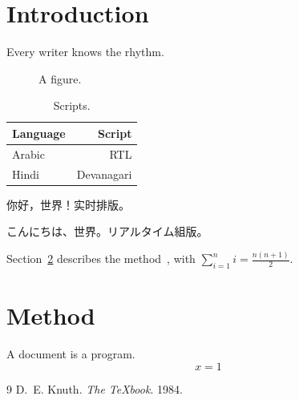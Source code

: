 \documentclass[11pt]{article}
\begin{document}
\section{Introduction}\label{sec:intro}
Every writer knows the rhythm.

\begin{figure}[h!]
\centering
\newcommand\petals{5}
\caption{A figure.}\label{fig:live}
\end{figure}

\begin{table}[h!]
\centering
\begin{tabular}{lr}\toprule Language & Script\\\midrule Arabic & RTL\\ Hindi & Devanagari\\\bottomrule\end{tabular}
\caption{Scripts.}
\end{table}



{\zhfont 你好，世界！实时排版。}

{\jafont こんにちは、世界。リアルタイム組版。}

Section~\ref{sec:method} describes the method~\cite{knuth84}, with $\sum_{i=1}^n i = \frac{n(n+1)}{2}$.

\newpage
\section{Method}\label{sec:method}
A document is a program.
\[ x = 1 \]

\begin{thebibliography}{9}
 D.~E. Knuth. \emph{The \TeX book}. 1984.
\end{thebibliography}
\end{document}

